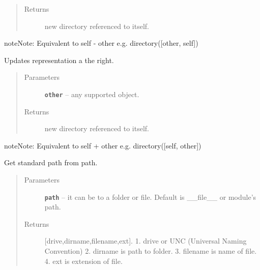 \documentclass[letterpaper,10pt,english]{sphinxmanual}
\begin{document}
\begin{fulllineitems}
\begin{fulllineitems}
\begin{quote}
\begin{description}
\item[{Returns}] \leavevmode
new directory referenced to itself.

\end{description}\end{quote}

\begin{notice}{note}{Note:}
Equivalent to self - other e.g. directory({[}other, self{]})
\end{notice}

\end{fulllineitems}


\begin{fulllineitems}
\label{RRtoolbox.lib:RRtoolbox.lib.directory.directory.update_right}
Updates representation a the right.
\begin{quote}\begin{description}
\item[{Parameters}] \leavevmode
\textbf{\texttt{other}} -- any supported object.

\item[{Returns}] \leavevmode
new directory referenced to itself.

\end{description}\end{quote}

\begin{notice}{note}{Note:}
Equivalent to self + other e.g. directory({[}self, other{]})
\end{notice}

\end{fulllineitems}


\end{fulllineitems}


\begin{fulllineitems}
\label{RRtoolbox.lib:RRtoolbox.lib.directory.getData}
Get standard path from path.
\begin{quote}\begin{description}
\item[{Parameters}] \leavevmode
\textbf{\texttt{path}} -- it can be to a folder or file. Default is \_\_file\_\_ or module's path.

\item[{Returns}] \leavevmode
{[}drive,dirname,filename,ext{]}.
1. drive or UNC (Universal Naming Convention)
2. dirname is path to folder.
3. filename is name of file.
4. ext is extension of file.

\end{description}\end{quote}

\end{fulllineitems}
\end{document}
